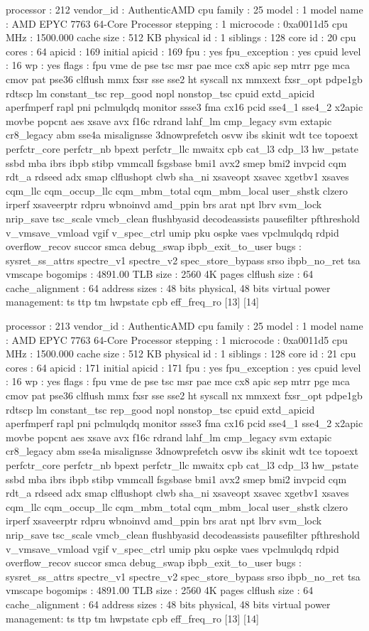 processor	: 212
vendor_id	: AuthenticAMD
cpu family	: 25
model		: 1
model name	: AMD EPYC 7763 64-Core Processor
stepping	: 1
microcode	: 0xa0011d5
cpu MHz		: 1500.000
cache size	: 512 KB
physical id	: 1
siblings	: 128
core id		: 20
cpu cores	: 64
apicid		: 169
initial apicid	: 169
fpu		: yes
fpu_exception	: yes
cpuid level	: 16
wp		: yes
flags		: fpu vme de pse tsc msr pae mce cx8 apic sep mtrr pge mca cmov pat pse36 clflush mmx fxsr sse sse2 ht syscall nx mmxext fxsr_opt pdpe1gb rdtscp lm constant_tsc rep_good nopl nonstop_tsc cpuid extd_apicid aperfmperf rapl pni pclmulqdq monitor ssse3 fma cx16 pcid sse4_1 sse4_2 x2apic movbe popcnt aes xsave avx f16c rdrand lahf_lm cmp_legacy svm extapic cr8_legacy abm sse4a misalignsse 3dnowprefetch osvw ibs skinit wdt tce topoext perfctr_core perfctr_nb bpext perfctr_llc mwaitx cpb cat_l3 cdp_l3 hw_pstate ssbd mba ibrs ibpb stibp vmmcall fsgsbase bmi1 avx2 smep bmi2 invpcid cqm rdt_a rdseed adx smap clflushopt clwb sha_ni xsaveopt xsavec xgetbv1 xsaves cqm_llc cqm_occup_llc cqm_mbm_total cqm_mbm_local user_shstk clzero irperf xsaveerptr rdpru wbnoinvd amd_ppin brs arat npt lbrv svm_lock nrip_save tsc_scale vmcb_clean flushbyasid decodeassists pausefilter pfthreshold v_vmsave_vmload vgif v_spec_ctrl umip pku ospke vaes vpclmulqdq rdpid overflow_recov succor smca debug_swap ibpb_exit_to_user
bugs		: sysret_ss_attrs spectre_v1 spectre_v2 spec_store_bypass srso ibpb_no_ret tsa vmscape
bogomips	: 4891.00
TLB size	: 2560 4K pages
clflush size	: 64
cache_alignment	: 64
address sizes	: 48 bits physical, 48 bits virtual
power management: ts ttp tm hwpstate cpb eff_freq_ro [13] [14]

processor	: 213
vendor_id	: AuthenticAMD
cpu family	: 25
model		: 1
model name	: AMD EPYC 7763 64-Core Processor
stepping	: 1
microcode	: 0xa0011d5
cpu MHz		: 1500.000
cache size	: 512 KB
physical id	: 1
siblings	: 128
core id		: 21
cpu cores	: 64
apicid		: 171
initial apicid	: 171
fpu		: yes
fpu_exception	: yes
cpuid level	: 16
wp		: yes
flags		: fpu vme de pse tsc msr pae mce cx8 apic sep mtrr pge mca cmov pat pse36 clflush mmx fxsr sse sse2 ht syscall nx mmxext fxsr_opt pdpe1gb rdtscp lm constant_tsc rep_good nopl nonstop_tsc cpuid extd_apicid aperfmperf rapl pni pclmulqdq monitor ssse3 fma cx16 pcid sse4_1 sse4_2 x2apic movbe popcnt aes xsave avx f16c rdrand lahf_lm cmp_legacy svm extapic cr8_legacy abm sse4a misalignsse 3dnowprefetch osvw ibs skinit wdt tce topoext perfctr_core perfctr_nb bpext perfctr_llc mwaitx cpb cat_l3 cdp_l3 hw_pstate ssbd mba ibrs ibpb stibp vmmcall fsgsbase bmi1 avx2 smep bmi2 invpcid cqm rdt_a rdseed adx smap clflushopt clwb sha_ni xsaveopt xsavec xgetbv1 xsaves cqm_llc cqm_occup_llc cqm_mbm_total cqm_mbm_local user_shstk clzero irperf xsaveerptr rdpru wbnoinvd amd_ppin brs arat npt lbrv svm_lock nrip_save tsc_scale vmcb_clean flushbyasid decodeassists pausefilter pfthreshold v_vmsave_vmload vgif v_spec_ctrl umip pku ospke vaes vpclmulqdq rdpid overflow_recov succor smca debug_swap ibpb_exit_to_user
bugs		: sysret_ss_attrs spectre_v1 spectre_v2 spec_store_bypass srso ibpb_no_ret tsa vmscape
bogomips	: 4891.00
TLB size	: 2560 4K pages
clflush size	: 64
cache_alignment	: 64
address sizes	: 48 bits physical, 48 bits virtual
power management: ts ttp tm hwpstate cpb eff_freq_ro [13] [14]

